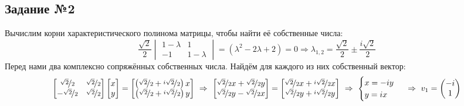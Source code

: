 \documentclass[a3paper,14pt]{extarticle}
\begin{document}
\subsection*{\centering Задание №2}
Вычислим корни характеристического полинома матрицы, чтобы найти её собственные числа:
$$\frac{\sqrt{2}}{2}\begin{vmatrix}
    1-\lambda & 1 \\ -1 & 1-\lambda
\end{vmatrix} = (\lambda^2 -2\lambda + 2) = 0 \Rightarrow \lambda_{1,2} = \frac{\sqrt{2}}{2} \pm \frac{i\sqrt{2}}{2}$$
Перед нами два комплексно сопряжённых собственных числа. Найдём для каждого из них собственный вектор:
$$\begin{bmatrix}
    \nicefrac{\sqrt{2}}{2} & \nicefrac{\sqrt{2}}{2} \\ -\nicefrac{\sqrt{2}}{2} & \nicefrac{\sqrt{2}}{2}
\end{bmatrix}\begin{bmatrix}
    x \\ y
\end{bmatrix} = \begin{bmatrix}
    \left(\nicefrac{\sqrt{2}}{2} + \nicefrac{i\sqrt{2}}{2}\right)x \\ \left(\nicefrac{\sqrt{2}}{2} + \nicefrac{i\sqrt{2}}{2}\right)y
\end{bmatrix} \ \Rightarrow\ \begin{bmatrix}
    \nicefrac{\sqrt{2}}{2}x + \nicefrac{\sqrt{2}}{2}y \\ \nicefrac{\sqrt{2}}{2}y -\nicefrac{\sqrt{2}}{2}x
\end{bmatrix} = \begin{bmatrix}
    \nicefrac{\sqrt{2}}{2}x + \nicefrac{i\sqrt{2}}{2}x \\ \nicefrac{\sqrt{2}}{2}y + \nicefrac{i\sqrt{2}}{2}y
\end{bmatrix} \ \Rightarrow\ \begin{cases}
    x = -iy \\
    y = ix
\end{cases} \ \Rightarrow\ v_1=\begin{pmatrix}
    -i \\ 1
\end{pmatrix}$$
\end{document}
